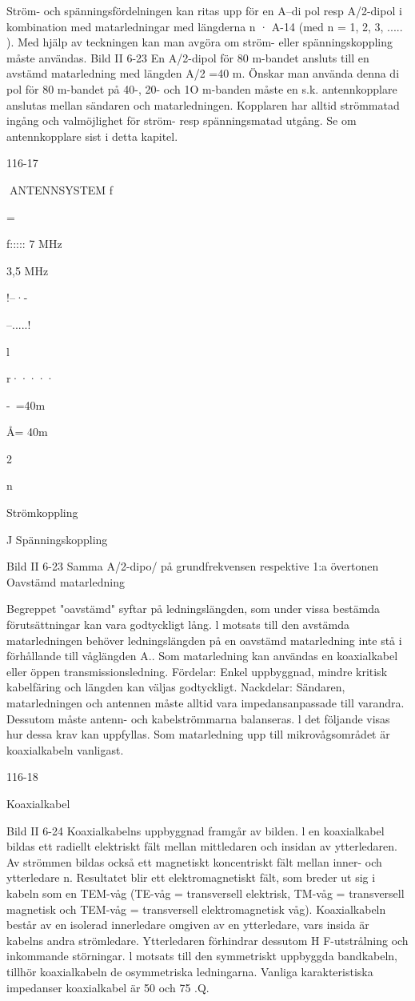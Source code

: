 Ström- och spänningsfördelningen kan
ritas upp för en A--di pol resp A/2-dipol i kombination med matarledningar med längderna
n · A-14 (med n = 1, 2, 3, ..... ). Med hjälp av
teckningen kan man avgöra om ström- eller
spänningskoppling måste användas.
Bild II 6-23
En A/2-dipol för 80 m-bandet ansluts till
en avstämd matarledning med längden A/2
=40 m.
Önskar man använda denna di pol för 80
m-bandet på 40-, 20- och 1O m-banden
måste en s.k. antennkopplare anslutas mellan sändaren och matarledningen. Kopplaren har alltid strömmatad ingång och valmöjlighet för ström- resp spänningsmatad
utgång. Se om antennkopplare sist i detta
kapitel.

116-17

ANTENNSYSTEM
f

=

f::::: 7 MHz

3,5 MHz

!--·-

--.....!

l

r·····

-~=40m

Å= 40m

2

n

Strömkoppling

J
Spänningskoppling

Bild II 6-23 Samma A/2-dipo/ på grundfrekvensen respektive 1:a övertonen
Oavstämd matarledning

Begreppet "oavstämd" syftar på ledningslängden, som under vissa bestämda förutsättningar kan vara godtyckligt lång. l motsats till den avstämda matarledningen behöver ledningslängden på en oavstämd matarledning inte stå i förhållande till våglängden A.. Som matarledning kan användas en
koaxialkabel eller öppen transmissionsledning.
Fördelar: Enkel uppbyggnad, mindre kritisk kabelfäring och längden kan väljas godtyckligt.
Nackdelar: Sändaren, matarledningen
och antennen måste alltid vara impedansanpassade till varandra. Dessutom måste
antenn- och kabelströmmarna balanseras. l
det följande visas hur dessa krav kan uppfyllas.
Som matarledning upp till mikrovågsområdet är koaxialkabeln vanligast.

116-18

Koaxialkabel

Bild II 6-24
Koaxialkabelns uppbyggnad framgår av bilden. l en koaxialkabel bildas ett radiellt
elektriskt fält mellan mittledaren och insidan
av ytterledaren. Av strömmen bildas också
ett magnetiskt koncentriskt fält mellan inner- och ytterledare n. Resultatet blir ett elektromagnetiskt fält, som breder ut sig i kabeln
som en TEM-våg (TE-våg = transversell
elektrisk, TM-våg = transversell magnetisk
och TEM-våg = transversell elektromagnetisk våg).
Koaxialkabeln består av en isolerad innerledare omgiven av en ytterledare, vars insida är kabelns andra strömledare. Ytterledaren förhindrar dessutom H F-utstrålning
och inkommande störningar. l motsats till
den symmetriskt uppbyggda bandkabeln,
tillhör koaxialkabeln de osymmetriska ledningarna.
Vanliga karakteristiska impedanser
koaxialkabel är 50 och 75 .Q.


